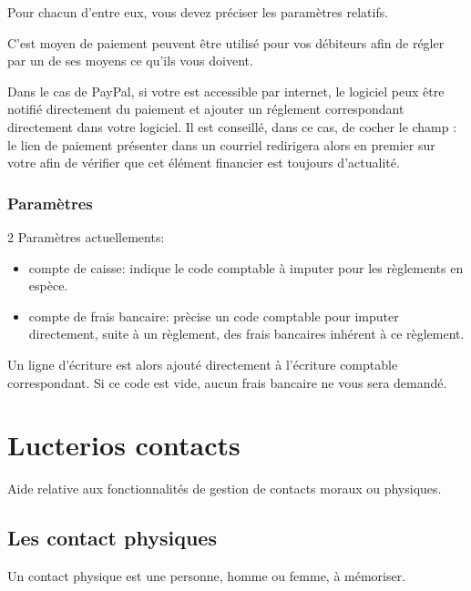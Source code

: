 \documentclass[a4paper,10pt,oneside,french]{sphinxmanual}
\begin{document}
Pour chacun d’entre eux, vous devez préciser les paramètres relatifs.

C’est moyen de paiement peuvent être utilisé pour vos débiteurs afin de régler par un de ses moyens ce qu’ils vous doivent.

Dans le cas de PayPal, si votre  est accessible par internet, le logiciel peux être notifié directement du paiement et ajouter un réglement correspondant directement dans votre logiciel.
Il est conseillé, dans ce cas, de cocher le champ : le lien de paiement présenter dans un courriel redirigera alors en premier sur votre  afin de vérifier que cet élément financier est toujours d’actualité.


\subsection{Paramètres}
\label{\detokenize{payoff/config:parametres}}
2 Paramètres actuellements:
\begin{itemize}
\item {} 
compte de caisse: indique le code comptable à imputer pour les règlements en espèce.

\item {} 
compte de frais bancaire: prècise un code comptable pour imputer directement, suite à un règlement, des frais bancaires inhérent à ce règlement.

\end{itemize}

Un ligne d’écriture est alors ajouté directement à l’écriture comptable correspondant.
Si ce code est vide, aucun frais bancaire ne vous sera demandé.


\chapter{Lucterios contacts}
\label{\detokenize{contacts/index::doc}}\label{\detokenize{contacts/index:lucterios-contacts}}
Aide relative aux fonctionnalités de gestion de contacts moraux ou physiques.


\section{Les contact physiques}
\label{\detokenize{contacts/individual::doc}}\label{\detokenize{contacts/individual:les-contact-physiques}}
Un contact physique est une personne, homme ou femme, à mémoriser.
\end{document}
